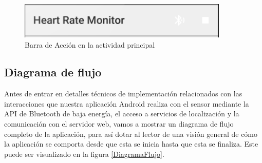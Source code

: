 \begin{figure}[h] \centering
	\includegraphics[width=10cm]{graphs/actionbar.png} \caption{Barra de Acción en la actividad principal }\label{fig:actionbar}
\end{figure}




\subsection{Diagrama de flujo} \label{diagramaFlujoAndroid}
	Antes de entrar en detalles técnicos de implementación relacionados con las interacciones que nuestra aplicación Android realiza con el sensor mediante la API de Bluetooth de baja energía, el acceso a servicios de localización y la comunicación con el servidor web, vamos a mostrar un diagrama de flujo completo de la aplicación, para así dotar al lector de una visión general de cómo la aplicación se comporta desde que esta se inicia hasta que esta se finaliza. Este puede ser visualizado en la figura \ref{DiagramaFlujo}.
	
	\filbreak
	
